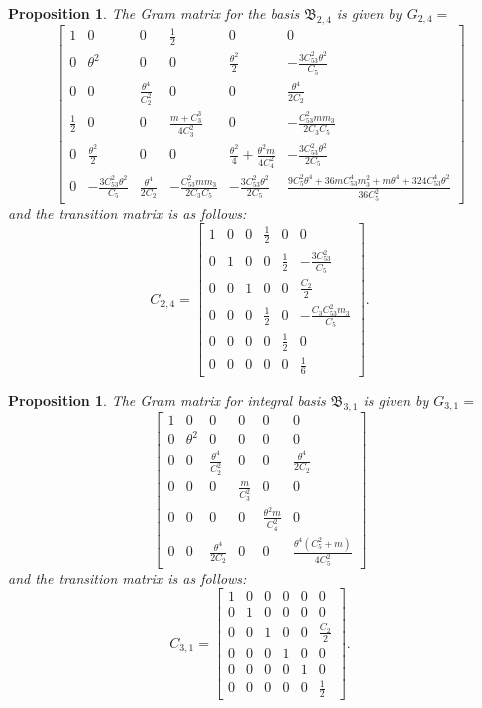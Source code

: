 \documentclass[table]{amsart}
\newtheorem{proposition}[theorem]{Proposition}
\numberwithin{equation}{section}
\begin{document}
\begin{proposition}
    The Gram matrix for the basis $\mathfrak{B}_{2, 4}$ is given by $G_{2,4}=$
    \[
\begin{bmatrix}
1 & 0 & 0 & \tfrac{1}{2} & 0 & 0 \\[6pt]
0 & \theta^2 & 0 & 0 & \tfrac{\theta^2}{2 } & -\tfrac{3 C_{53}^2 \theta^2}{ C_5} \\[6pt]
0 & 0 & \tfrac{\theta^4}{C_2^2} & 0 & 0 & \tfrac{\theta^4}{2 C_2} \\[6pt]
\tfrac{1}{2} & 0 & 0 & \tfrac{m+C_3^3}{4 C_3^2} & 0 & -\tfrac{C_{53}^2 m m_3}{2 C_3 C_5} \\[6pt]
0 & \tfrac{\theta^2}{2 } & 0 & 0 & \tfrac{\theta^2}{4 } + \tfrac{\theta^2 m}{4 C_4^2} & -\tfrac{3 C_{53}^2 \theta^2}{2  C_5} \\[6pt]
0 & -\tfrac{3 C_{53}^2 \theta^2}{ C_5} & \tfrac{\theta^4}{2 C_2} & -\tfrac{C_{53}^2 m m_3}{2 C_3 C_5} & -\tfrac{3 C_{53}^2 \theta^2}{2  C_5} & \tfrac{9  C_5^2 \theta^4 + 36 m  C_{53}^4 m_3^2 + m  \theta^4 + 324 C_{53}^4 \theta^2}{36  C_5^2}
\end{bmatrix}
\]
and the transition matrix is as follows:
\[
C_{2,4}=\begin{bmatrix}
1 & 0 & 0 & \tfrac{1}{2} & 0 & 0 \\[6pt]
0 & 1 & 0 & 0 & \tfrac{1}{2} & -\tfrac{3 C_{53}^2}{C_5} \\[6pt]
0 & 0 & 1 & 0 & 0 & \tfrac{C_2}{2} \\[6pt]
0 & 0 & 0 & \tfrac{1}{2} & 0 & -\tfrac{C_3 C_{53}^2 m_3}{C_5} \\[6pt]
0 & 0 & 0 & 0 & \tfrac{1}{2} & 0 \\[6pt]
0 & 0 & 0 & 0 & 0 & \tfrac{1}{6}
\end{bmatrix}.
\]
\end{proposition}

\begin{proposition}
    The Gram matrix  for integral basis $\mathfrak{B}_{3, 1}$ is given by $G_{3, 1}=$
    \[
\begin{bmatrix}
1 & 0 & 0 & 0 & 0 & 0 \\[8pt]
0 & \theta^2 & 0 & 0 & 0 & 0 \\[8pt]
0 & 0 & \tfrac{\theta^4}{C_2^2} & 0 & 0 & \tfrac{\theta^4}{2 C_2} \\[8pt]
0 & 0 & 0 & \tfrac{m}{C_3^2} & 0 & 0 \\[8pt]
0 & 0 & 0 & 0 & \tfrac{\theta^2 m}{C_4^2} & 0 \\[8pt]
0 & 0 & \tfrac{\theta^4}{2 C_2} & 0 & 0 & \tfrac{\theta^4 (C_5^2 + m)}{4 C_5^2}
\end{bmatrix}
\] and the transition matrix is as follows:
\[
C_{3,1}=\begin{bmatrix}
1 & 0 & 0 & 0 & 0 & 0 \\[8pt]
0 & 1 & 0 & 0 & 0 & 0 \\[8pt]
0 & 0 & 1 & 0 & 0 & \tfrac{C_2}{2} \\[8pt]
0 & 0 & 0 & 1 & 0 & 0 \\[8pt]
0 & 0 & 0 & 0 & 1 & 0 \\[8pt]
0 & 0 & 0 & 0 & 0 & \tfrac{1}{2}
\end{bmatrix}.
\]
\end{proposition}
\end{document}
